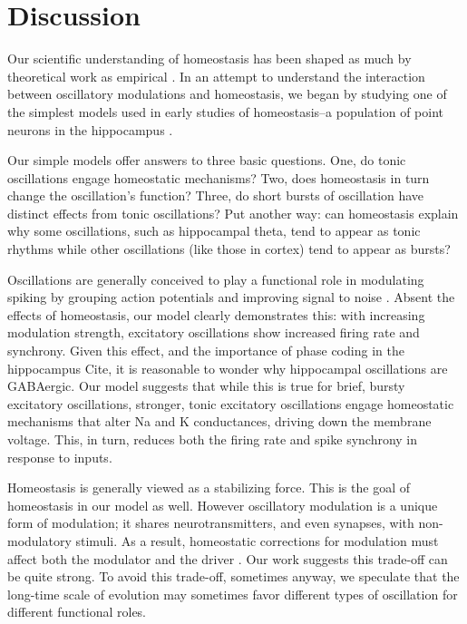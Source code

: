 \documentclass{article}
\begin{document}
\section*{Discussion}
Our scientific understanding of homeostasis has been shaped as much by theoretical work as empirical \cite{Marder2014}. In an attempt to understand the interaction between oscillatory modulations and homeostasis, we began by studying one of the simplest models used in early studies of homeostasis--a population of point neurons in the hippocampus \cite{LeMasson1993}.

Our simple models offer answers to three basic questions. One, do tonic oscillations engage homeostatic mechanisms? Two, does homeostasis in turn change the oscillation's function? Three, do short bursts of oscillation have distinct effects from tonic oscillations? Put another way: can homeostasis explain why some oscillations, such as hippocampal theta, tend to appear as tonic rhythms while other oscillations (like those in cortex) tend to appear as bursts? \cite{Peterson2017,Cole2018,vanEde2018a}

Oscillations are generally conceived to play a functional role in modulating spiking \cite{Fries2015a,vanEde2018b} by grouping action potentials and improving signal to noise \cite{Chen2013,Zhou2015,Voytek2015a,Peterson2017}. Absent the effects of homeostasis, our model clearly demonstrates this: with increasing modulation strength, excitatory oscillations show increased firing rate and synchrony. Given this effect, and the importance of phase coding in the hippocampus {Cite}, it is reasonable to wonder why hippocampal oscillations are GABAergic. Our model suggests that while this is true for brief, bursty excitatory oscillations, stronger, tonic excitatory oscillations engage homeostatic mechanisms that alter Na and K conductances, driving down the membrane voltage. This, in turn, reduces both the firing rate and spike synchrony in response to inputs.

Homeostasis is generally viewed as a stabilizing force. This is the goal of homeostasis in our model as well. However oscillatory modulation is a unique form of modulation; it shares neurotransmitters, and even synapses, with non-modulatory stimuli. As a result, homeostatic corrections for modulation must affect both the modulator and the driver \cite{Sherman1998}. Our work suggests this trade-off can be quite strong. To avoid this trade-off, sometimes anyway, we speculate that the long-time scale of evolution may sometimes favor different types of oscillation for different functional roles.
\end{document}
